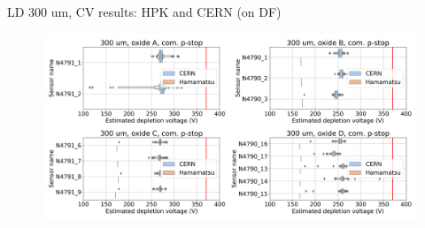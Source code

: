 \documentclass{beamer}
\begin{document}
\begin{frame}{LD 300 um, CV results: HPK and CERN (on DF)}
    \begin{figure}
        \includegraphics[width=.9\textwidth]{plots/CV_ComparisonHPKCERN_300um_All.png}    
    \end{figure}
  \href{https://indico.cern.ch/event/1085830/contributions/4565314/attachments/2344490/3998306/IVCV_recent_HGCal_prototype_sensors_Readiness_Review.pdf}{}
\end{frame}



    
\end{document}

